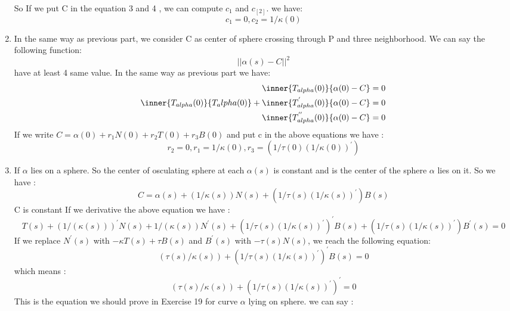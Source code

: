 \documentclass[
	12pt, %
]{fphw}
\theoremstyle{plain}
\begin{document}
\begin{enumerate}
\begin{equation}
     \end{equation}
     So If we put  C in the equation 3 and 4 , we can compute $c_{1}$ and $c_[2]$. we have:
     \begin{equation}
          c_{1} = 0 ,c_{2} = 1/\kappa(0)     
     \end{equation}
     \item In the same way as previous part, we consider C as center of sphere  crossing through P and three neighborhood. We can say the following function:
     \begin{equation}
          ||\alpha(s)-C||^2  
     \end{equation}
     have at least 4 same value. In the same way as previous part we have: 
     \begin{align}
          \inner{T_{alpha}(0)}{\alpha(0)-C} & = 0 \\ 
          \inner{T_{alpha}(0)}{T_alpha(0)} + \inner{T_{alpha}^{'}(0)}{\alpha(0)-C} & = 0 \\
          \inner{T_{alpha}^{''}(0)}{\alpha(0)-C} & = 0
     \end{align} 
     If we write $ C = \alpha(0) + r_1 N(0) + r_2 T(0) + r_3 B(0)$ and put c in the above equations we have :
     \begin{equation}
          r_{2} = 0 ,r_{1} = 1/\kappa(0) , r_3 = (1/\tau(0)(1/\kappa(0))^{'})  
     \end{equation}
     \item 
     If $\alpha$ lies on a sphere. So the center of osculating sphere at each $\alpha(s)$ is constant and is the center of the sphere
     $\alpha$ lies on it. So we have :
     \begin{equation}
          C = \alpha(s) + (1/\kappa(s)) N(s) +  (1/\tau(s)(1/\kappa(s))^{'}) B(s) 
     \end{equation}
     C is constant If we derivative the above equation we have :
     \begin{equation}
         T(s) + (1/(\kappa(s)))^{'} N(s) + 1/(\kappa(s)) N^{'}(s) +   (1/\tau(s)(1/\kappa(s))^{'})^{'} B(s) +  (1/\tau(s)(1/\kappa(s))^{'}) B^{'}(s) = 0
     \end{equation}  
     If we replace $N^{'}(s)$ with $-\kappa T(s) + \tau B(s)$ and $B^{'}(s)$ with $-\tau(s) N(s)$, we reach the  following equation:
     \begin{equation}
          (\tau(s) / \kappa(s)) + (1/\tau(s)(1/\kappa(s))^{'})^{'} B(s) = 0
     \end{equation}
     which means :
     \begin{equation}
          (\tau(s) / \kappa(s)) + (1/\tau(s)(1/\kappa(s))^{'})^{'} = 0
     \end{equation}
     This is the equation we should prove in Exercise 19 for curve $\alpha$ lying on sphere. we can say :
\end{enumerate}
\end{document}
